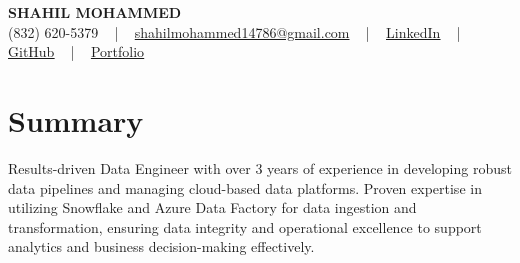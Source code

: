 \documentclass[letterpaper,10pt]{article}
\begin{document}
\begin{center}
    {\fontsize{14pt}{12pt}\selectfont \textbf{\MakeUppercase{Shahil Mohammed}}}\\ \vspace{2pt}
    \fontsize{10pt}{12pt}\selectfont (832) 620-5379 ~ | ~ \href{mailto:shahilmohammed14786@gmail.com}{shahilmohammed14786@gmail.com} ~ | ~  
    \href{https://www.linkedin.com/in/shahil-mohammed-9652931a1/}{\color{blue}\underline{LinkedIn}}  ~ | ~ 
    \href{https://github.com/freakbeast14}{\color{blue}\underline{GitHub}} ~ | ~ 
    \href{https://shahil-mohammed.netlify.app/}{\color{blue}\underline{Portfolio}}
    \vspace{-8pt}
\end{center}

\section{Summary}
\vspace{-2pt}\fontsize{8pt}{9pt}\selectfont
Results-driven Data Engineer with over 3 years of experience in developing robust data pipelines and managing cloud-based data platforms. Proven expertise in utilizing Snowflake and Azure Data Factory for data ingestion and transformation, ensuring data integrity and operational excellence to support analytics and business decision-making effectively.
 \vspace{-5pt}
 
\vspace{-2pt}
\end{document}
